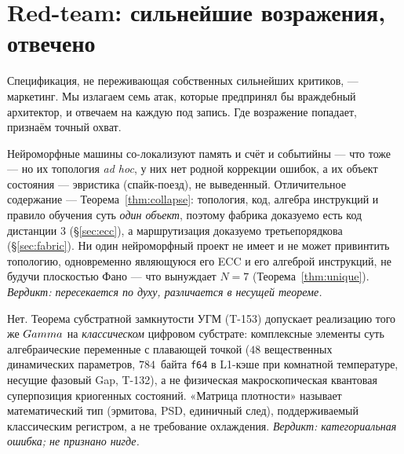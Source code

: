 \section{Red-team: сильнейшие возражения, отвечено}
\label{sec:redteam}

Спецификация, не переживающая собственных сильнейших критиков, --- маркетинг. Мы
излагаем семь атак, которые предпринял бы враждебный архитектор, и отвечаем на
каждую под запись. Где возражение попадает, признаём точный охват.

\begin{redteambox}
Нейроморфные машины со-локализуют память и счёт и событийны --- что \TALOS{}
тоже --- но их топология \emph{ad hoc}, у них нет родной коррекции ошибок, а их
объект состояния --- эвристика (спайк-поезд), не выведенный. Отличительное
содержание \TALOS{} --- Теорема~\ref{thm:collapse}: топология, код, алгебра
инструкций и правило обучения суть \emph{один объект}, поэтому фабрика доказуемо
есть код дистанции 3 (\S\ref{sec:ecc}), а маршрутизация доказуемо третьепорядкова
(\S\ref{sec:fabric}). Ни один нейроморфный проект не имеет и не может привинтить
топологию, одновременно являющуюся его ECC и его алгеброй инструкций, не будучи
плоскостью Фано --- что вынуждает $N=7$ (Теорема~\ref{thm:unique}). \emph{Вердикт:
пересекается по духу, различается в несущей теореме.}
\end{redteambox}

\begin{redteambox}
Нет. Теорема субстратной замкнутости УГМ (T-153) допускает реализацию того же
$Gamma$ на \emph{классическом} цифровом субстрате: комплексные элементы суть
алгебраические переменные с плавающей точкой ($48$ вещественных динамических
параметров, $784$~байта \texttt{f64} в L1-кэше при комнатной температуре,
несущие фазовый Gap, T-132), а не физическая макроскопическая квантовая
суперпозиция криогенных состояний. «Матрица плотности» называет математический
тип (эрмитова, PSD, единичный след), поддерживаемый классическим регистром, а
не требование охлаждения. \emph{Вердикт: категориальная ошибка; не признано
нигде.}
\end{redteambox}

